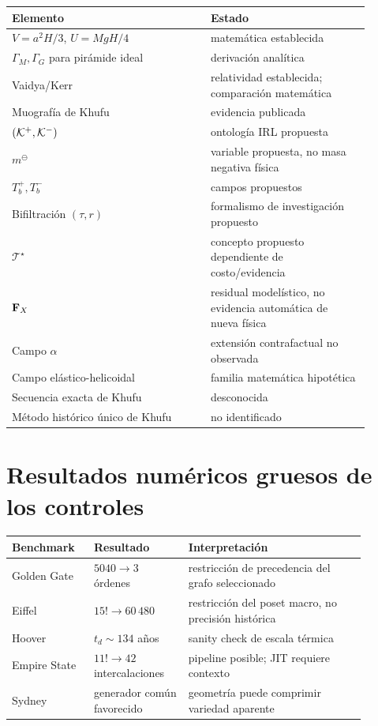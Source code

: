 \begin{longtable}{p{0.50\linewidth}p{0.40\linewidth}}
\toprule
Elemento & Estado \\
\midrule
\(V=a^2H/3\), \(U=MgH/4\) & matemática establecida \\
\(\Gamma_M,\Gamma_G\) para pirámide ideal & derivación analítica \\
Vaidya/Kerr & relatividad establecida; comparación matemática \\
Muografía de Khufu & evidencia publicada \\
\((\mathcal K^{+},\mathcal K^{-})\) & ontología IRL propuesta \\
\(m^\ominus\) & variable propuesta, no masa negativa física \\
\(T_b^+,T_b^-\) & campos propuestos \\
Bifiltración \((\tau,r)\) & formalismo de investigación propuesto \\
\(\mathcal T^\star\) & concepto propuesto dependiente de costo/evidencia \\
\(\mathbf F_X\) & residual modelístico, no evidencia automática de nueva física \\
Campo \(\alpha\) & extensión contrafactual no observada \\
Campo elástico-helicoidal & familia matemática hipotética \\
Secuencia exacta de Khufu & desconocida \\
Método histórico único de Khufu & no identificado \\
\bottomrule
\end{longtable}

\section{Resultados numéricos gruesos de los controles}

\begin{longtable}{p{0.20\linewidth}p{0.24\linewidth}p{0.45\linewidth}}
\toprule
Benchmark & Resultado & Interpretación \\
\midrule
Golden Gate & \(5040\rightarrow3\) órdenes & restricción de precedencia del grafo seleccionado \\
Eiffel & \(15!\rightarrow60\,480\) & restricción del poset macro, no precisión histórica \\
Hoover & \(t_d\sim134\) años & sanity check de escala térmica \\
Empire State & \(11!\rightarrow42\) intercalaciones & pipeline posible; JIT requiere contexto \\
Sydney & generador común favorecido & geometría puede comprimir variedad aparente \\
\bottomrule
\end{longtable}
